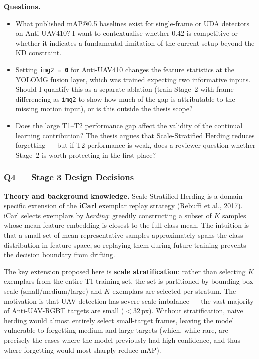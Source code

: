\textbf{Questions.}
\begin{itemize}
    \item What published mAP@0.5 baselines exist for
          single-frame or UDA detectors on Anti-UAV410?
          I want to contextualise whether 0.42 is competitive
          or whether it indicates a fundamental limitation
          of the current setup beyond the KD constraint.

    \item Setting \texttt{img2\,=\,\textbf{0}} for Anti-UAV410
          changes the feature statistics at the YOLOMG fusion
          layer, which was trained expecting two informative
          inputs. Should I quantify this as a separate ablation
          (train Stage~2 with frame-differencing as
          \texttt{img2} to show how much of the gap is
          attributable to the missing motion input), or is
          this outside the thesis scope?

    \item Does the large T1--T2 performance gap affect the
          validity of the continual learning contribution?
          The thesis argues that Scale-Stratified Herding
          reduces forgetting --- but if T2 performance is
          weak, does a reviewer question whether Stage~2
          is worth protecting in the first place?
\end{itemize}

\subsubsection*{Q4 — Stage 3 Design Decisions}

\textbf{Theory and background knowledge.}
Scale-Stratified Herding is a domain-specific extension of the
\textbf{iCarl} exemplar replay strategy (Rebuffi et al., 2017).
iCarl selects exemplars by \emph{herding}: greedily constructing
a subset of $K$ samples whose mean feature embedding is closest
to the full class mean. The intuition is that a small set of
mean-representative samples approximately spans the class
distribution in feature space, so replaying them during future
training prevents the decision boundary from drifting.

The key extension proposed here is \textbf{scale stratification}: rather than
selecting $K$ exemplars from the entire T1 training set, the set is
partitioned by bounding-box scale (small/medium/large) and
$K$ exemplars are selected per stratum. The motivation is that UAV
detection has severe scale imbalance --- the vast majority of
Anti-UAV-RGBT targets are small ($<$32\,px). Without stratification,
naive herding would almost entirely select small-target frames,
leaving the model vulnerable to forgetting medium and large targets
(which, while rare, are precisely the cases where the model
previously had high confidence, and thus where forgetting would
most sharply reduce mAP).


